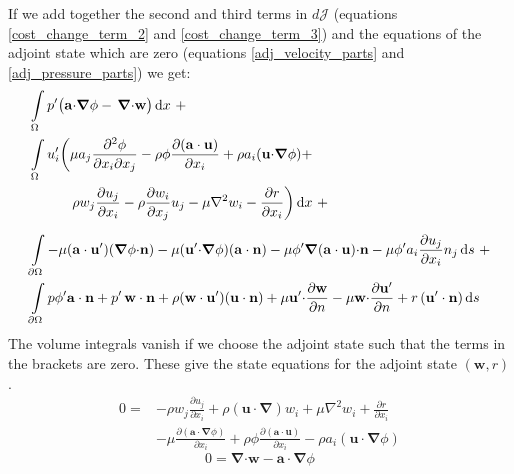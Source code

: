 \documentclass[12pt, a4paper]{article}
\begin{document}
If we add together the second and third terms in $d \mathcal{J}$ (equations \ref{cost_change_term_2} and \ref{cost_change_term_3}) and the equations of the adjoint state which are zero (equations \ref{adj_velocity_parts} and \ref{adj_pressure_parts}) we get:
\begin{equation} \label{cost_change_term_2345}
\begin{split}
&\int\limits_{\Omega} p' \big{(}
\mathbf{a \cdot} \boldsymbol{\nabla} \phi -
\, \boldsymbol{\nabla} \mathbf{\cdot w}
\big{)} \, \mathrm{d}x \ + \\
&\int\limits_{\Omega} u'_i \bigg{(}
\mu a_j \frac{\partial^2 \phi}{\partial x_i \partial x_j}  - 
\rho \phi \frac{\partial (\mathbf{a \cdot u})}{\partial x_i} +
\rho a_i (\mathbf{u \cdot} \boldsymbol{\nabla} \phi) + \\
& \phantom{\int\limits_{\Omega} u'_i \bigg{(} \ }
\rho w_j \frac{\partial u_j}{\partial x_i} - 
\rho \frac{\partial w_i}{\partial x_j} u_j - 
\mu \nabla^2 w_i - 
\frac{\partial r}{\partial x_i}
\bigg{)} \, \mathrm{d}x \ + \\
&\int\limits_{\partial \Omega}
-\mu (\mathbf{a \cdot u'}) (\boldsymbol{\nabla} \phi \mathbf{\cdot n}) - 
\mu (\mathbf{u' \cdot} \boldsymbol{\nabla} \phi) (\mathbf{a \cdot n}) - 
\mu \phi' \boldsymbol{\nabla}(\mathbf{a \cdot u}) \mathbf{\cdot n} - 
\mu \phi' a_i \frac{\partial u_j}{\partial x_i} n_j
\, \mathrm{d}s \ + \\
&\int\limits_{\partial \Omega}
p \phi' \mathbf{a \cdot n} +
p' \, \mathbf{w \cdot n} + 
\rho (\mathbf{w \cdot u'}) (\mathbf{u \cdot n}) + 
\mu \mathbf{u' \cdot} \frac{\partial \mathbf{w}}{\partial n} - 
\mu \mathbf{w \cdot} \frac{\partial \mathbf{u'}}{\partial n} + 
r \, (\mathbf{u' \cdot n})
\, \mathrm{d}s
\end{split}
\end{equation}
The volume integrals vanish if we choose the adjoint state such that the terms in the brackets are zero. These give the state equations for the adjoint state $(\mathbf{w}, r)$.
\begin{equation}
\begin{split}
0 = & -\rho w_j \frac{\partial u_j}{\partial x_i} +
\rho (\mathbf{u \cdot} \boldsymbol{\nabla}) w_i +
\mu \nabla^2 w_i +
\frac{\partial r}{\partial x_i} \\ 
& -\mu \frac{\partial (\mathbf{a \cdot} \boldsymbol{\nabla} \phi)}{\partial x_i} +
\rho \phi \frac{\partial (\mathbf{a \cdot u})}{\partial x_i} - 
\rho a_i (\mathbf{u \cdot} \boldsymbol{\nabla} \phi)
\end{split}
\end{equation}
\begin{equation}
0 = \boldsymbol{\nabla} \mathbf{\cdot w} - 
\mathbf{a \cdot} \boldsymbol{\nabla} \phi
\end{equation}
\end{document}
